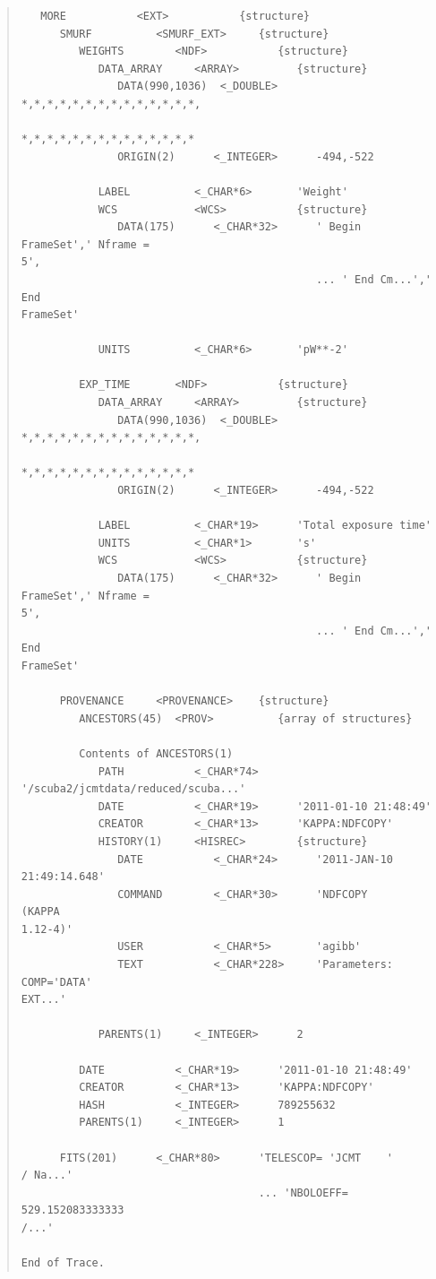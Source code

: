 \documentclass[twoside,11pt]{article}
\renewcommand{\_}{\texttt{\symbol{95}}}
\newenvironment{myquote}{\begin{quote}\begin{small}}{\end{small}\end{quote}}
\begin{document}
\begin{myquote}
\begin{verbatim}
   MORE           <EXT>           {structure}
      SMURF          <SMURF_EXT>     {structure}
         WEIGHTS        <NDF>           {structure}
            DATA_ARRAY     <ARRAY>         {structure}
               DATA(990,1036)  <_DOUBLE>      *,*,*,*,*,*,*,*,*,*,*,*,*,*,
                                              *,*,*,*,*,*,*,*,*,*,*,*,*,*
               ORIGIN(2)      <_INTEGER>      -494,-522

            LABEL          <_CHAR*6>       'Weight'
            WCS            <WCS>           {structure}
               DATA(175)      <_CHAR*32>      ' Begin FrameSet',' Nframe =
5',
                                              ... ' End Cm...',' End
FrameSet'

            UNITS          <_CHAR*6>       'pW**-2'

         EXP_TIME       <NDF>           {structure}
            DATA_ARRAY     <ARRAY>         {structure}
               DATA(990,1036)  <_DOUBLE>      *,*,*,*,*,*,*,*,*,*,*,*,*,*,
                                              *,*,*,*,*,*,*,*,*,*,*,*,*,*
               ORIGIN(2)      <_INTEGER>      -494,-522

            LABEL          <_CHAR*19>      'Total exposure time'
            UNITS          <_CHAR*1>       's'
            WCS            <WCS>           {structure}
               DATA(175)      <_CHAR*32>      ' Begin FrameSet',' Nframe =
5',
                                              ... ' End Cm...',' End
FrameSet'

      PROVENANCE     <PROVENANCE>    {structure}
         ANCESTORS(45)  <PROV>          {array of structures}

         Contents of ANCESTORS(1)
            PATH           <_CHAR*74>
'/scuba2/jcmtdata/reduced/scuba...'
            DATE           <_CHAR*19>      '2011-01-10 21:48:49'
            CREATOR        <_CHAR*13>      'KAPPA:NDFCOPY'
            HISTORY(1)     <HISREC>        {structure}
               DATE           <_CHAR*24>      '2011-JAN-10 21:49:14.648'
               COMMAND        <_CHAR*30>      'NDFCOPY         (KAPPA
1.12-4)'
               USER           <_CHAR*5>       'agibb'
               TEXT           <_CHAR*228>     'Parameters: COMP='DATA'
EXT...'

            PARENTS(1)     <_INTEGER>      2

         DATE           <_CHAR*19>      '2011-01-10 21:48:49'
         CREATOR        <_CHAR*13>      'KAPPA:NDFCOPY'
         HASH           <_INTEGER>      789255632
         PARENTS(1)     <_INTEGER>      1

      FITS(201)      <_CHAR*80>      'TELESCOP= 'JCMT    '           / Na...'
                                     ... 'NBOLOEFF=     529.152083333333
/...'

End of Trace.
\end{verbatim}
\end{myquote}
\end{document}
